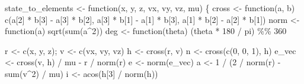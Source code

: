 \documentclass[
  10.5pt,
  letterpaper,
]{scrbook}
\newenvironment{Shaded}{\begin{snugshade}}{\end{snugshade}}
\newcommand{\ControlFlowTok}[1]{\textcolor[rgb]{0.00,0.00,0.00}{#1}}
\newcommand{\DecValTok}[1]{\textcolor[rgb]{0.00,0.00,0.00}{#1}}
\newcommand{\FunctionTok}[1]{\textcolor[rgb]{0.00,0.00,0.00}{#1}}
\newcommand{\NormalTok}[1]{\textcolor[rgb]{0.00,0.00,0.00}{#1}}
\newcommand{\OtherTok}[1]{\textcolor[rgb]{0.00,0.00,0.00}{#1}}
\newcommand{\SpecialCharTok}[1]{\textcolor[rgb]{0.00,0.00,0.00}{#1}}
\theoremstyle{plain}
\theoremstyle{remark}
\begin{document}
\begin{Shaded}
\begin{Highlighting}[]
\NormalTok{state\_to\_elements }\OtherTok{\textless{}{-}} \ControlFlowTok{function}\NormalTok{(x, y, z, vx, vy, vz, mu) \{}
\NormalTok{  cross }\OtherTok{\textless{}{-}} \ControlFlowTok{function}\NormalTok{(a, b) }\FunctionTok{c}\NormalTok{(a[}\DecValTok{2}\NormalTok{] }\SpecialCharTok{*}\NormalTok{ b[}\DecValTok{3}\NormalTok{] }\SpecialCharTok{{-}}\NormalTok{ a[}\DecValTok{3}\NormalTok{] }\SpecialCharTok{*}\NormalTok{ b[}\DecValTok{2}\NormalTok{],}
\NormalTok{                            a[}\DecValTok{3}\NormalTok{] }\SpecialCharTok{*}\NormalTok{ b[}\DecValTok{1}\NormalTok{] }\SpecialCharTok{{-}}\NormalTok{ a[}\DecValTok{1}\NormalTok{] }\SpecialCharTok{*}\NormalTok{ b[}\DecValTok{3}\NormalTok{],}
\NormalTok{                            a[}\DecValTok{1}\NormalTok{] }\SpecialCharTok{*}\NormalTok{ b[}\DecValTok{2}\NormalTok{] }\SpecialCharTok{{-}}\NormalTok{ a[}\DecValTok{2}\NormalTok{] }\SpecialCharTok{*}\NormalTok{ b[}\DecValTok{1}\NormalTok{])}
\NormalTok{  norm  }\OtherTok{\textless{}{-}} \ControlFlowTok{function}\NormalTok{(a) }\FunctionTok{sqrt}\NormalTok{(}\FunctionTok{sum}\NormalTok{(a}\SpecialCharTok{\^{}}\DecValTok{2}\NormalTok{))}
\NormalTok{  deg   }\OtherTok{\textless{}{-}} \ControlFlowTok{function}\NormalTok{(theta) (theta }\SpecialCharTok{*} \DecValTok{180} \SpecialCharTok{/}\NormalTok{ pi) }\SpecialCharTok{\%\%} \DecValTok{360}

\NormalTok{  r }\OtherTok{\textless{}{-}} \FunctionTok{c}\NormalTok{(x, y, z); v }\OtherTok{\textless{}{-}} \FunctionTok{c}\NormalTok{(vx, vy, vz)}
\NormalTok{  h }\OtherTok{\textless{}{-}} \FunctionTok{cross}\NormalTok{(r, v)}
\NormalTok{  n }\OtherTok{\textless{}{-}} \FunctionTok{cross}\NormalTok{(}\FunctionTok{c}\NormalTok{(}\DecValTok{0}\NormalTok{, }\DecValTok{0}\NormalTok{, }\DecValTok{1}\NormalTok{), h)}
\NormalTok{  e\_vec }\OtherTok{\textless{}{-}} \FunctionTok{cross}\NormalTok{(v, h) }\SpecialCharTok{/}\NormalTok{ mu }\SpecialCharTok{{-}}\NormalTok{ r }\SpecialCharTok{/} \FunctionTok{norm}\NormalTok{(r)}
\NormalTok{  e }\OtherTok{\textless{}{-}} \FunctionTok{norm}\NormalTok{(e\_vec)}
\NormalTok{  a }\OtherTok{\textless{}{-}} \DecValTok{1} \SpecialCharTok{/}\NormalTok{ (}\DecValTok{2} \SpecialCharTok{/} \FunctionTok{norm}\NormalTok{(r) }\SpecialCharTok{{-}} \FunctionTok{sum}\NormalTok{(v}\SpecialCharTok{\^{}}\DecValTok{2}\NormalTok{) }\SpecialCharTok{/}\NormalTok{ mu)}
\NormalTok{  i }\OtherTok{\textless{}{-}} \FunctionTok{acos}\NormalTok{(h[}\DecValTok{3}\NormalTok{] }\SpecialCharTok{/} \FunctionTok{norm}\NormalTok{(h))}


\end{Highlighting}
\end{Shaded}
\end{document}
